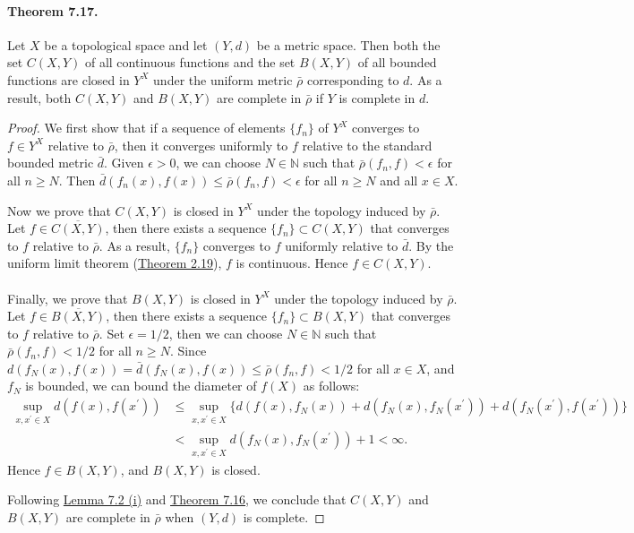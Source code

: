 \documentclass{article}
\numberwithin{equation}{section}
\theoremstyle{plain}
\theoremstyle{definition}
\begin{document}
\paragraph{Theorem 7.17.\label{thm:7.17}} Let $X$ be a topological space and let $(Y,d)$ be a metric space. Then both the set $C(X,Y)$ of all continuous functions and the set $B(X,Y)$ of all bounded functions are closed in $Y^X$ under the uniform metric $\bar{\rho}$ corresponding to $d$. As a result, both $C(X,Y)$ and $B(X,Y)$ are complete in $\bar{\rho}$ if $Y$ is complete in $d$.
\begin{proof}
We first show that if a sequence of elements $\{f_n\}$ of $Y^X$ converges to $f\in Y^X$ relative to $\bar{\rho}$, then it converges uniformly to $f$ relative to the standard bounded metric $\bar{d}$. Given $\epsilon >0$, we can choose $N\in\mathbb{N}$ such that $\bar{\rho}\left(f_n,f\right) < \epsilon$ for all $n\geq N$. Then $\bar{d}\left(f_n(x),f(x)\right) \leq \bar{\rho}\left(f_n,f\right) < \epsilon$ for all $n\geq N$ and all $x\in X$.

Now we prove that $C(X,Y)$ is closed in $Y^X$ under the topology induced by $\bar{\rho}$. Let $f\in\overline{C(X,Y)}$, then there exists a sequence $\{f_n\}\subset C(X,Y)$ that converges to $f$ relative to $\bar{\rho}$. As a result, $\{f_n\}$ converges to $f$ uniformly relative to $\bar{d}$. By the uniform limit theorem (\hyperref[thm:2.19]{Theorem 2.19}), $f$ is continuous. Hence $f\in C(X,Y)$.

\paragraph{} Finally, we prove that $B(X,Y)$ is closed in $Y^X$ under the topology induced by $\bar{\rho}$. Let $f\in\overline{B(X,Y)}$, then there exists a sequence $\{f_n\}\subset B(X,Y)$ that converges to $f$ relative to $\bar{\rho}$. Set $\epsilon=1/2$, then we can choose $N\in\mathbb{N}$ such that $\bar{\rho}\left(f_n,f\right)<1/2$ for all $n\geq N$. Since  $d\left(f_N(x),f(x)\right)=\bar{d}\left(f_N(x),f(x)\right)\leq\bar{\rho}\left(f_n,f\right)<1/2$ for all $x\in X$, and $f_N$ is bounded, we can bound the diameter of $f(X)$ as follows:
\begin{align*}
\sup_{x,x^\prime\in X} d(f(x),f(x^\prime)) &\leq \sup_{x,x^\prime\in X}\bigl\{d(f(x),f_N(x)) + d(f_N(x),f_N(x^\prime)) + d(f_N(x^\prime),f(x^\prime))\bigr\} \\
&< \sup_{x,x^\prime\in X} d(f_N(x),f_N(x^\prime)) + 1 < \infty.
\end{align*}
Hence $f\in B(X,Y)$, and $B(X,Y)$ is closed.

Following \hyperref[lemma:7.2]{Lemma 7.2 (i)} and \hyperref[thm:7.16]{Theorem 7.16}, we conclude that $C(X,Y)$ and $B(X,Y)$ are complete in $\bar{\rho}$ when $(Y,d)$ is complete.
\end{proof}
\end{document}
